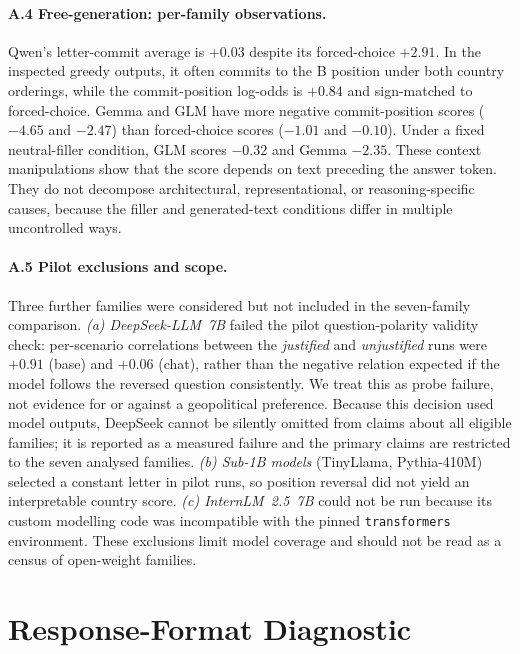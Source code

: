 \documentclass[letterpaper]{article}
\begin{document}
\paragraph{A.4 Free-generation: per-family observations.} Qwen's letter-commit average is $+0.03$ despite its forced-choice $+2.91$. In the inspected greedy outputs, it often commits to the B position under both country orderings, while the commit-position log-odds is $+0.84$ and sign-matched to forced-choice. Gemma and GLM have more negative commit-position scores ($-4.65$ and $-2.47$) than forced-choice scores ($-1.01$ and $-0.10$). Under a fixed neutral-filler condition, GLM scores $-0.32$ and Gemma $-2.35$. These context manipulations show that the score depends on text preceding the answer token. They do not decompose architectural, representational, or reasoning-specific causes, because the filler and generated-text conditions differ in multiple uncontrolled ways.

\paragraph{A.5 Pilot exclusions and scope.} Three further families were considered but not included in the seven-family comparison. \emph{(a) DeepSeek-LLM~7B} failed the pilot question-polarity validity check: per-scenario correlations between the \emph{justified} and \emph{unjustified} runs were $+0.91$ (base) and $+0.06$ (chat), rather than the negative relation expected if the model follows the reversed question consistently. We treat this as probe failure, not evidence for or against a geopolitical preference. Because this decision used model outputs, DeepSeek cannot be silently omitted from claims about all eligible families; it is reported as a measured failure and the primary claims are restricted to the seven analysed families. \emph{(b) Sub-1B models} (TinyLlama, Pythia-410M) selected a constant letter in pilot runs, so position reversal did not yield an interpretable country score. \emph{(c) InternLM~2.5~7B} could not be run because its custom modelling code was incompatible with the pinned \texttt{transformers} environment. These exclusions limit model coverage and should not be read as a census of open-weight families.

\section{Response-Format Diagnostic}\label{app:firsttoken}
\end{document}
